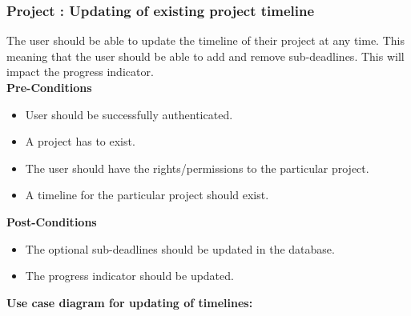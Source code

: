 \subsubsection{Project : Updating of existing project timeline}
The user should be able to update the timeline of their project at any time. This meaning that the user should be able to add and remove sub-deadlines. This will impact the progress indicator.\\
\textbf{Pre-Conditions}
\begin{itemize}
	\item User should be successfully authenticated.
	\item A project has to exist.
	\item The user should have the rights/permissions to the particular project.
	\item A timeline for the particular project should exist.
\end{itemize}
\textbf{Post-Conditions}
\begin{itemize}
	\item The optional sub-deadlines should be updated in the database.
	\item The progress indicator should be updated.
\end{itemize}
\textbf{Use case diagram for updating of timelines: }\\
\centerline{}

